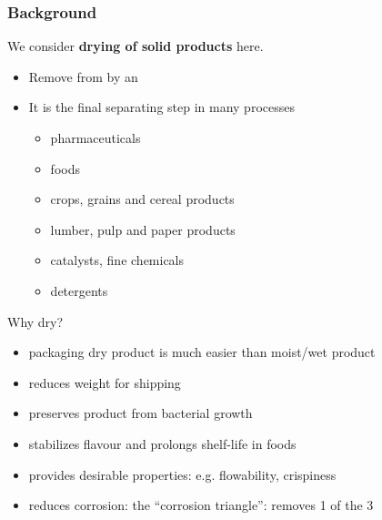\begin{frame}\frametitle{Background}
	We consider \textbf{drying of solid products} here.
	\begin{itemize}
		\item	Remove {\color{myOrange}{liquid phase}} from {\color{myOrange}{solid phase}} by an {\color{myOrange}{ESA = thermal energy}}
		\item	It is the final separating step in many processes
		\begin{itemize}
			\item	pharmaceuticals
			\item	foods
			\item	crops, grains and cereal products
			\item	lumber, pulp and paper products
			\item	catalysts, fine chemicals
			\item	detergents
		\end{itemize}
	\end{itemize}
	Why dry?
	\begin{itemize}
		\item	packaging dry product is much easier than moist/wet product
		\item	reduces weight for shipping
		\item	preserves product from bacterial growth
		\item	stabilizes flavour and prolongs shelf-life in foods
		\item	provides desirable properties: e.g. flowability, crispiness
		\item	reduces corrosion: the ``corrosion triangle'': removes 1 of the 3
	\end{itemize}
\end{frame}

